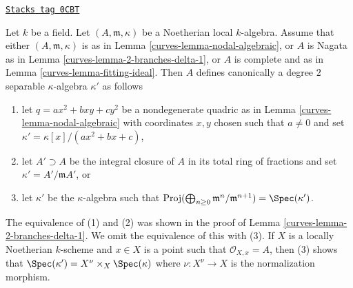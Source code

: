 \begin{remark}

\label{curves-remark-quadratic-extension}
\href{https://stacks.math.columbia.edu/tag/0CBT}{\texttt{Stacks tag 0CBT}}

Let $k$ be a field. Let $(A, \mathfrak m, \kappa)$ be a
Noetherian local $k$-algebra. Assume that either
$(A, \mathfrak m, \kappa)$ is as in Lemma \ref{curves-lemma-nodal-algebraic}, or
$A$ is Nagata as in Lemma \ref{curves-lemma-2-branches-delta-1}, or
$A$ is complete and as in Lemma \ref{curves-lemma-fitting-ideal}.
Then $A$ defines canonically a degree $2$ separable $\kappa$-algebra
$\kappa'$ as follows
\begin{enumerate}
\item let $q = ax^2 + bxy + cy^2$ be a nondegenerate quadric
as in Lemma \ref{curves-lemma-nodal-algebraic} with coordinates $x, y$ chosen
such that $a \not = 0$ and set
$\kappa' = \kappa[x]/(ax^2 + bx + c)$,
\item let $A' \supset A$ be the integral closure of $A$ in its
total ring of fractions and set $\kappa' = A'/\mathfrak m A'$, or
\item let $\kappa'$ be the $\kappa$-algebra such that
$\text{Proj}(\bigoplus_{n \geq 0} \mathfrak m^n/\mathfrak m^{n + 1}) =
\Spec(\kappa')$.
\end{enumerate}
The equivalence of (1) and (2) was shown in the proof of
Lemma \ref{curves-lemma-2-branches-delta-1}. We omit the equivalence of
this with (3). If $X$ is a locally Noetherian $k$-scheme and $x \in X$
is a point such that $\mathcal{O}_{X, x} = A$, then (3) shows that
$\Spec(\kappa') = X^\nu \times_X \Spec(\kappa)$ where $\nu : X^\nu \to X$
is the normalization morphism.
\end{remark}

